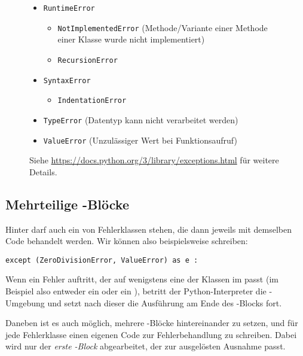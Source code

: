 \begin{figure}
\begin{tcolorbox}[title=Ausgewählte Fehlerklassen]
\begin{itemize}
\begin{itemize}
\begin{itemize}
			\end{itemize}
		\item \texttt{RuntimeError}
			\begin{itemize}
			\item \texttt{NotImplementedError} (Methode/Variante einer Methode einer Klasse wurde nicht implementiert)
      \item \texttt{RecursionError}
			\end{itemize}
		\item \texttt{SyntaxError}
			\begin{itemize}
			\item \texttt{IndentationError}
			\end{itemize}
		\item \texttt{TypeError} (Datentyp kann nicht verarbeitet werden)
		\item \texttt{ValueError} (Unzulässiger Wert bei Funktionsaufruf)
	\end{itemize}
\end{itemize}
Siehe \url{https://docs.python.org/3/library/exceptions.html} für weitere Details.
\end{tcolorbox}
\end{figure}


\subsection{Mehrteilige -Blöcke}
Hinter  darf auch ein  von Fehlerklassen stehen, die dann jeweils mit demselben Code behandelt werden. Wir können also beispielsweise schreiben:
\begin{codebox}
\begin{verbatim}
except (ZeroDivisionError, ValueError) as e :
\end{verbatim}
\end{codebox}
Wenn ein Fehler auftritt, der auf wenigstens eine der Klassen im  passt (im Beispiel also entweder ein  oder ein ), betritt der Python-Interpreter die -Umgebung und setzt nach dieser die Ausführung am Ende des -Blocks fort.

Daneben ist es auch möglich, mehrere -Blöcke hintereinander zu setzen, und für jede Fehlerklasse einen eigenen Code zur Fehlerbehandlung zu schreiben. Dabei wird nur der \emph{erste -Block} abgearbeitet, der zur ausgelösten Ausnahme passt.

